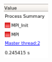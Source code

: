 \documentclass[12pt]{article}
\begin{document}
\begin{sloppypar}
\begin{figure}[ht]
\begin{minipage}[t]{0.12\textwidth}
    \end{minipage}
    \begin{minipage}[t]{0.12\textwidth}
        \includegraphics[width=\textwidth]{res/init-phase-p2.PNG}
    \end{minipage}
    \begin{minipage}[t]{0.12\textwidth}

\end{minipage}
\end{figure}
\end{sloppypar}
\end{document}
